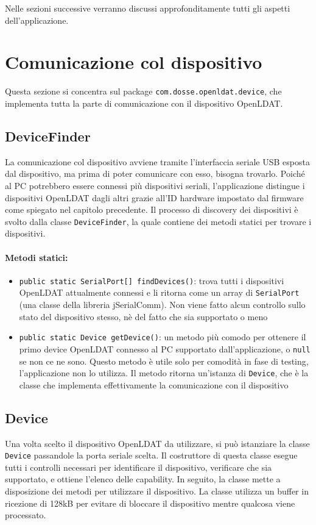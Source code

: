 Nelle sezioni successive verranno discussi approfonditamente tutti gli aspetti dell'applicazione.

\section{Comunicazione col dispositivo}
Questa sezione si concentra sul package \texttt{com.dosse.openldat.device}, che implementa tutta la parte di comunicazione con il dispositivo OpenLDAT.

\subsection{DeviceFinder}
La comunicazione col dispositivo avviene tramite l'interfaccia seriale USB esposta dal dispositivo, ma prima di poter comunicare con esso, bisogna trovarlo. Poiché al PC potrebbero essere connessi più dispositivi seriali, l'applicazione distingue i dispositivi OpenLDAT dagli altri grazie all'ID hardware impostato dal firmware come spiegato nel capitolo precedente.
Il processo di discovery dei dispositivi è svolto dalla classe \texttt{DeviceFinder}, la quale contiene dei metodi statici per trovare i dispositivi.

\paragraph{Metodi statici:}\begin{itemize}
	\item \texttt{public static SerialPort[] findDevices()}: trova tutti i dispositivi OpenLDAT attualmente connessi e li ritorna come un array di \texttt{SerialPort} (una classe della libreria jSerialComm). Non viene fatto alcun controllo sullo stato del dispositivo stesso, nè del fatto che sia supportato o meno
	\item \texttt{public static Device getDevice()}: un metodo più comodo per ottenere il primo device OpenLDAT connesso al PC supportato dall'applicazione, o \texttt{null} se non ce ne sono. Questo metodo è utile solo per comodità in fase di testing, l'applicazione non lo utilizza. Il metodo ritorna un'istanza di \texttt{Device}, che è la classe che implementa effettivamente la comunicazione con il dispositivo
\end{itemize}

\subsection{Device}
Una volta scelto il dispositivo OpenLDAT da utilizzare, si può istanziare la classe \texttt{Device} passandole la porta seriale scelta. Il costruttore di questa classe esegue tutti i controlli necessari per identificare il dispositivo, verificare che sia supportato, e ottiene l'elenco delle capability. In seguito, la classe mette a disposizione dei metodi per utilizzare il dispositivo. La classe utilizza un buffer in ricezione di 128kB per evitare di bloccare il dispositivo mentre qualcosa viene processato.

